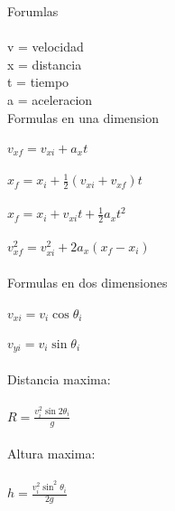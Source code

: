 \documentclass{article}
\begin{document}
    \large
    Forumlas \\ \\
    v = velocidad \\
    x = distancia \\
    t = tiempo \\
    a = aceleracion \\
    Formulas en una dimension \\ \\
    $v_{xf} = v_{xi} + a_x t$ \\ \\
    $x_f = x_i + \frac{1}{2} (v_{xi} + v_{xf})t$ \\ \\
    $x_f = x_i + v_{xi}t + \frac{1}{2} a_xt^{2}$ \\ \\
    $v_{xf}^2 = v_{xi}^2+2a_x(x_f-x_i)$ \\ \\
    Formulas en dos dimensiones \\ \\
    $v_{xi} = v_i\cos \theta _i$ \\ \\
    $v_{yi} = v_i\sin \theta _i$ \\ \\
    Distancia maxima: \\ \\ 
    $R = \frac{v_i^2\sin 2\theta _i}{g}$ \\ \\
    Altura maxima: \\ \\
    $h = \frac{v_i ^2 \sin ^2\theta _i}{2g}$
\end{document}
